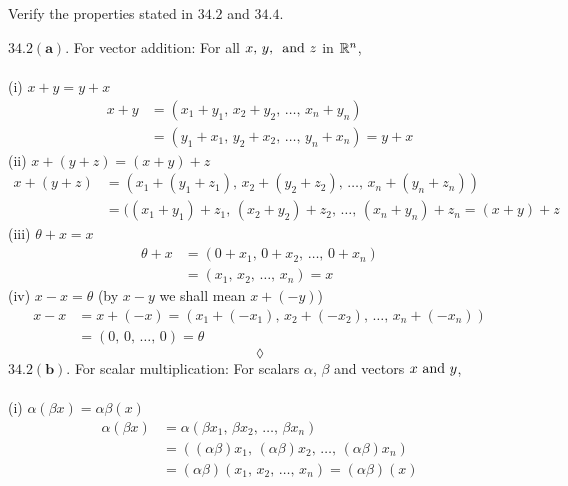 \subsection{}
\begin{tcolorbox}
Verify the properties stated in $\mathbf{34.2}$ and $\mathbf{34.4}$.
\end{tcolorbox}
$$ $$
$\mathbf{34.2( a)}$. For vector addition: For all $x,\, y,\, \text{ and } z$ in $\mathbb{R}^n $,\\\\
(i) $x + y = y + x$\\
\begin{align*}
x + y &= (x_1+y_1,\, x_2+y_2,\,\dots  ,\,x_n+y_n) \\ 
&= (y_1+x_1,\, y_2+x_2,\,\dots ,\, y_n+x_n) = y+x
\end{align*}
(ii) $x + (y + z) = (x +y) + z$\\
\begin{align*}
x + (y + z)&= (x_1+(y_1+z_1),\, x_2+(y_2+z_2),\,\dots ,\, x_n+(y_n+z_n))\\ &=((x_1+y_1)+z_1,\, (x_2+y_2)+z_2,\,\dots ,\, (x_n+y_n)+z_n = (x+y)+z
\end{align*}
(iii) $\theta + x = x$\\
\begin{align*}
\theta + x &= (0+x_1,\, 0+x_2,\,\dots ,\, 0+x_n)\\ &=(x_1,\, x_2,\,\dots ,\, x_n)=x
\end{align*}
(iv) $x - x =\theta $ (by $x - y$ we shall mean $x + (-y)$)\\
\begin{align*}
x-x &= x+(-x)= (x_1+(-x_1),\, x_2+(-x_2),\,\dots ,\, x_n+(-x_n))\\ &=(0,\, 0,\,\dots ,\, 0)=\theta
\end{align*}
$$\lozenge$$
$\mathbf{34.2( b)}$. For scalar multiplication: For scalars $\alpha,\, \beta$ and vectors $x \text{ and } y$,\\\\
(i) $\alpha(\beta x) = \alpha\beta(x)$\\
\begin{align*}
\alpha(\beta x)&= \alpha(\beta x_1,\, \beta x_2,\,\dots ,\, \beta x_n)\\
&= ((\alpha\beta) x_1,\, (\alpha\beta) x_2,\,\dots ,\,(\alpha \beta) x_n)\\
&= (\alpha\beta)( x_1,\,  x_2,\,\dots ,\, x_n)=(\alpha\beta)(x)\\
\end{align*}
